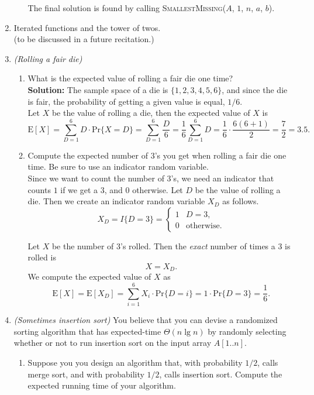 \documentclass[letterpaper,11pt]{article}
\newcommand{\E}{\ensuremath{\mathrm{E}}}
\newcommand{\Prob}{\ensuremath{\mathrm{Pr}}}
\begin{document}
\begin{enumerate}
\begin{enumerate}
\noindent The final solution is found by calling \textsc{SmallestMissing}($A$, $1$, $n$, $a$, $b$).

\end{enumerate}

\newpage
\item Iterated functions and the tower of twos.\\

(to be discussed in a future recitation.)\\


\item \emph{(Rolling a fair die)}
\begin{enumerate}
\item What is the expected value of rolling a fair die one time?\\

\textbf{Solution:} The sample space of a die is $\{1,2,3,4,5,6\}$, and since the die is fair, the probability of getting a given value is equal, $1/6$.\\

Let $X$ be the value of rolling a die, then the expected value of $X$ is
\[\E[X]= \sum_{D=1}^{6}D\cdot\Prob\{X = D\} = \sum_{D=1}^{6}\frac{D}{6} = \frac{1}{6}\sum_{D=1}^{6}D = \frac{1}{6}\cdot\frac{6(6+1)}{2} = \frac{7}{2} = 3.5.\]
\item Compute the expected number of $3$'s you get when rolling a fair die one time. Be sure to use an indicator random variable.\\

Since we want to count the number of $3$'s, we need an indicator that counts $1$ if we get a $3$, and $0$ otherwise. Let $D$ be the value of rolling a die. Then we create an indicator random variable $X_D$ as follows.
\[X_D = I\{D=3\} = \begin{cases}1& D = 3,\\0& \text{otherwise.}\end{cases}\]

Let $X$ be the number of 3's rolled. Then the \emph{exact} number of times a 3 is rolled is
\[X = X_D.\]
We compute the expected value of $X$ as
\[\E[X] = \E[X_D] = \sum_{i=1}^{6}X_i\cdot\Prob\{D = i\} = 1\cdot\Prob\{D = 3\} = \frac{1}{6}.\]
\end{enumerate}
\newpage
\item \emph{(Sometimes insertion sort)} You believe that you can devise a randomized sorting algorithm that has expected-time $\Theta(n\lg n)$ by randomly selecting whether or not to run insertion sort on the input array $A[1..n]$.
\begin{enumerate}
\item Suppose you you design an algorithm that, with probability $1/2$, calls merge sort, and with probability $1/2$, calls insertion sort. Compute the expected running time of your algorithm. \\


\end{enumerate}
\end{enumerate}
\end{document}
